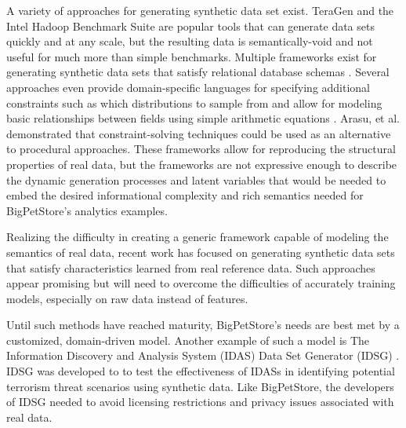 \documentclass[conference]{IEEEtran}
\begin{document}
A variety of approaches for generating synthetic data set exist.  TeraGen and the Intel Hadoop Benchmark Suite \cite{Huang2010} are popular tools that can generate data sets quickly and at any scale, but the resulting data is semantically-void and not useful for much more than simple benchmarks.  Multiple frameworks exist for generating synthetic data sets that satisfy relational database schemas \cite{Ghazal2013,Rabl2011a,Frank2012,Rabl2011,Gray1994,Bruno2005,Hoag2007}. Several approaches even provide domain-specific languages \cite{Bruno2005,Hoag2007} for specifying additional constraints such as which distributions to sample from and allow for modeling basic relationships between fields using simple arithmetic equations \cite{Alexandrov2012}. Arasu, et al. \cite{Arasu2011} demonstrated that constraint-solving techniques could be used as an alternative to procedural approaches. These frameworks allow for reproducing the structural properties of real data, but the frameworks are not expressive enough to describe the dynamic generation processes and latent variables that would be needed to embed the desired informational complexity and rich semantics needed for BigPetStore's analytics examples.

Realizing the difficulty in creating a generic framework capable of modeling the semantics of real data, recent work\cite{Alexandrov2013} has focused on generating synthetic data sets that satisfy characteristics learned from real reference data. Such approaches appear promising but will need to overcome the difficulties of accurately training models, especially on raw data instead of features.

Until such methods have reached maturity, BigPetStore's needs are best met by a customized, domain-driven model. Another example of such a model is The Information Discovery and Analysis System (IDAS) Data Set Generator (IDSG) \cite{Jeske2005,Lin2006}. IDSG was developed to to test the effectiveness of IDASs in identifying potential terrorism threat scenarios using synthetic data.  Like BigPetStore, the developers of IDSG needed to avoid licensing restrictions and privacy issues associated with real data.


\end{document}
